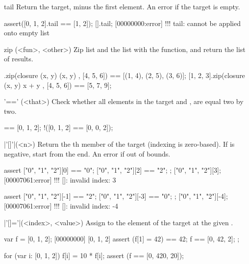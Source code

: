\begin{urbiscriptapi}
\item[tail]
  Return the target, minus the first element. An error if the target
  is empty.

\begin{urbiscript}
assert([0, 1, 2].tail == [1, 2]);
[].tail;
[00000000:error] !!! tail: cannot be applied onto empty list
\end{urbiscript}

\item[zip](<fun>, <other>)%
  Zip \this list and the  list with the  function, and
  return the list of results.

\begin{urbiassert}
[1, 2, 3].zip(closure (x, y) { (x, y) }, [4, 5, 6])
       == [(1, 4), (2, 5), (3, 6)];
[1, 2, 3].zip(closure (x, y) { x + y }, [4, 5, 6])
       == [5, 7, 9];
\end{urbiassert}

\item['=='](<that>)%
Check whether all elements in the target and , are
equal two by two.

\begin{urbiassert}
[0, 1, 2] == [0, 1, 2];
!([0, 1, 2] == [0, 0, 2]);
\end{urbiassert}

\item|'[]'|(<n>)%
  Return the th member of the target (indexing is
  zero-based). If  is negative, start from the end.  An error
  if out of bounds.

\begin{urbiscript}
assert
{
  ["0", "1", "2"][0] == "0";
  ["0", "1", "2"][2] == "2";
};
["0", "1", "2"][3];
[00007061:error] !!! []: invalid index: 3

assert
{
  ["0", "1", "2"][-1] == "2";
  ["0", "1", "2"][-3] == "0";
};
["0", "1", "2"][-4];
[00007061:error] !!! []: invalid index: -4
\end{urbiscript}

\item|'[]='|(<index>, <value>)%
  Assign  to the element of the target at the given
  .

\begin{urbiscript}
var f = [0, 1, 2];
[00000000] [0, 1, 2]
assert
{
  (f[1] = 42) == 42;
  f == [0, 42, 2];
};

for (var i: [0, 1, 2])
  f[i] = 10 * f[i];
assert (f == [0, 420, 20]);
\end{urbiscript}


\end{urbiscriptapi}
